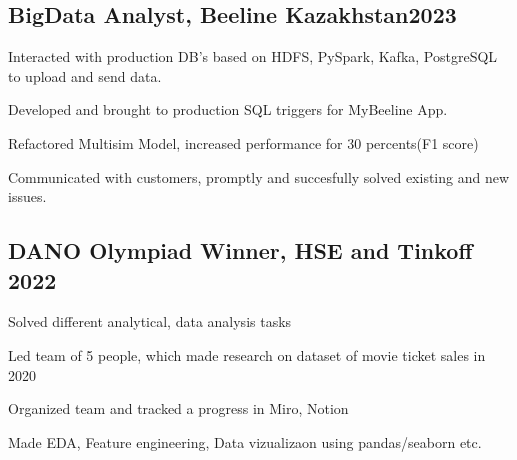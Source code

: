\documentclass[a4paper,12pt]{article}
\begin{document}
\subsection{{BigData Analyst, Beeline Kazakhstan}\hfill 2023}
\begin{zitemize}
\item Interacted with production DB's based on HDFS, PySpark, Kafka, PostgreSQL to upload and send data.
\item Developed and brought to production SQL triggers for MyBeeline App.
\item Refactored  Multisim Model, increased performance for 30 percents(F1 score)
\item Communicated with customers, promptly and succesfully solved existing and new issues.
\end{zitemize}



\vspace*{5pt}
\subsection{{DANO Olympiad Winner, HSE and Tinkoff }\hfill 2022}
\begin{zitemize}
\item Solved different analytical, data analysis tasks
\item Led team of 5 people, which made research on dataset of
movie ticket sales in 2020
\item Organized team and tracked a progress in Miro, Notion
\item Made EDA, Feature engineering, Data vizualizaon using
pandas/seaborn etc.
\end{zitemize}

\end{document}

